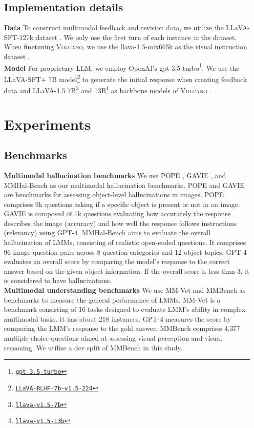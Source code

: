 \documentclass[11pt]{article}
\newcommand{\Ours}{\textsc{Volcano}}
\begin{document}
\subsection{Implementation details}
\label{subsec:imple}
\textbf{Data} To construct multimodal feedback and revision data, we utilize the LLaVA-SFT-127k dataset \citep{sun2023aligning}. We only use the first turn of each instance in the dataset. When finetuning {\Ours}, we use the llava-1.5-mix665k as the visual instruction dataset \citep{liu2023improved}. \\
\textbf{Model} For proprietary LLM, we employ OpenAI's gpt-3.5-turbo\footnote{\href{https://platform.openai.com/docs/models/gpt-3-5}{\texttt{gpt-3.5-turbo}}}. We use the LLaVA-SFT+ 7B model\footnote{\href{https://huggingface.co/zhiqings/LLaVA-RLHF-7b-v1.5-224}{\texttt{LLaVA-RLHF-7b-v1.5-224}}} to generate the initial response when creating feedback data and LLaVA-1.5 7B\footnote{\href{https://huggingface.co/liuhaotian/llava-v1.5-7b}{\texttt{llava-v1.5-7b}}} and 13B\footnote{\href{https://huggingface.co/liuhaotian/llava-v1.5-13b}{\texttt{llava-v1.5-13b}}} as backbone models of {\Ours} \citep{liu2023improved, liu2023visual}.
\section{Experiments}
\label{sec:exp}
\subsection{Benchmarks}
\label{subsec:bench}
\textbf{Multimodal hallucination benchmarks} We use POPE \citep{li2023evaluating}, GAVIE \citep{liu2023mitigating}, and MMHal-Bench \citep{sun2023aligning} as our multimodal hallucination benchmarks. POPE and GAVIE are benchmarks for assessing object-level hallucinations in images. POPE comprises 9k questions asking if a specific object is present or not in an image. GAVIE is composed of 1k questions evaluating how accurately the response describes the image (accuracy) and how well the response follows instructions (relevancy) using GPT-4. MMHal-Bench aims to evaluate the overall hallucination of LMMs, consisting of realistic open-ended questions. It comprises 96 image-question pairs across 8 question categories and 12 object topics. GPT-4 evaluates an overall score by comparing the model's response to the correct answer based on the given object information. If the overall score is less than 3, it is considered to have hallucinations. \\
\textbf{Multimodal understanding benchmarks} We use MM-Vet \citep{yu2023mmvet} and MMBench \citep{liu2023mmbench} as benchmarks to measure the general performance of LMMs. MM-Vet is a benchmark consisting of 16 tasks designed to evaluate LMM's ability in complex multimodal tasks. It has about 218 instances. GPT-4 measures the score by comparing the LMM's response to the gold answer. MMBench comprises 4,377 multiple-choice questions aimed at assessing visual perception and visual reasoning. We utilize a dev split of MMBench in this study.
\end{document}
